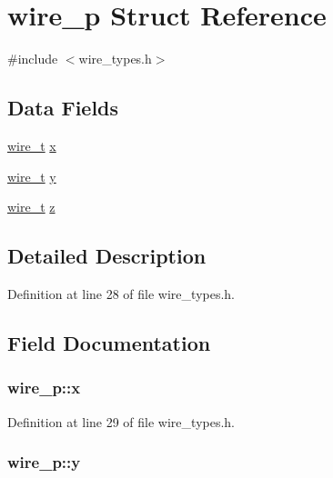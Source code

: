 \hypertarget{structwire__p}{\section{wire\-\_\-p Struct Reference}
\label{structwire__p}
}


{\ttfamily \#include $<$wire\-\_\-types.\-h$>$}

\subsection*{Data Fields}
\begin{DoxyCompactItemize}
\item 
\hyperlink{wire__types_8h_ace84d5e6e326f6a52d978bd9900baee6}{wire\-\_\-t} \hyperlink{structwire__p_a7a555c323bd3699ff2db08a3b3e791ed}{x}
\item 
\hyperlink{wire__types_8h_ace84d5e6e326f6a52d978bd9900baee6}{wire\-\_\-t} \hyperlink{structwire__p_a32b151309922af59db0cafea09e77b67}{y}
\item 
\hyperlink{wire__types_8h_ace84d5e6e326f6a52d978bd9900baee6}{wire\-\_\-t} \hyperlink{structwire__p_a423cfb83825fc447478c866e4c2f6520}{z}
\end{DoxyCompactItemize}


\subsection{Detailed Description}


Definition at line 28 of file wire\-\_\-types.\-h.



\subsection{Field Documentation}
\hypertarget{structwire__p_a7a555c323bd3699ff2db08a3b3e791ed}{
\subsubsection[{x}]{ wire\-\_\-p\-::x}}\label{structwire__p_a7a555c323bd3699ff2db08a3b3e791ed}


Definition at line 29 of file wire\-\_\-types.\-h.

\hypertarget{structwire__p_a32b151309922af59db0cafea09e77b67}{
\subsubsection[{y}]{ wire\-\_\-p\-::y}}\label{structwire__p_a32b151309922af59db0cafea09e77b67}


